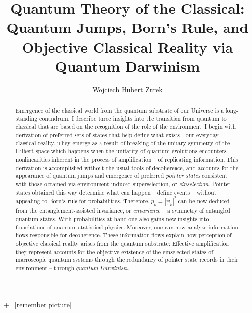 \documentclass[aps,amsmath,amssymb,amsfonts,floatfix]{revtex4-1}
\newcommand{\+}         {\dagger}
\begin{document}
+=[remember picture]

\title{Quantum Theory of the Classical: Quantum Jumps, Born's Rule, and \\ 
Objective Classical Reality via Quantum Darwinism}

\author{Wojciech Hubert Zurek}

\address{Theory Division, MS B213, LANL
    Los Alamos, NM, 87545, U.S.A.}


\begin{abstract} Emergence of the classical world from the quantum substrate of our Universe is a long-standing conundrum. 
I describe three insights into the transition from quantum to classical that are based on the recognition of the role of the environment. 
I begin with derivation of preferred sets of states that help define what exists - our everyday classical reality. They emerge as a result of breaking of the unitary symmetry of the Hilbert
space which happens when the unitarity of quantum evolutions encounters nonlinearities inherent in the process of amplification -- of replicating information.
 This derivation is accomplished without the usual tools of decoherence, and accounts for the appearance of quantum jumps and emergence of preferred {\it pointer states}
consistent with those obtained via environment-induced superselection, or {\it einselection}. Pointer states obtained this way determine what can happen -- define 
events -- without appealing to Born's rule for probabilities. Therefore, $p_k=|\psi_k|^2$ can be now deduced from the entanglement-assisted invariance, or {\it envariance} 
-- a symmetry of entangled quantum states. With probabilities at hand one also gains new insights into foundations of quantum statistical physics. Moreover, one can now
analyze information flows responsible for decoherence. These information flows explain how perception of objective classical reality arises from the quantum substrate: Effective amplification they represent accounts for the objective existence of the einselected states of macroscopic quantum systems through the redundancy of pointer state records in their
environment -- through {\it quantum Darwinism}. 
\end{abstract}
\maketitle
\end{document}
